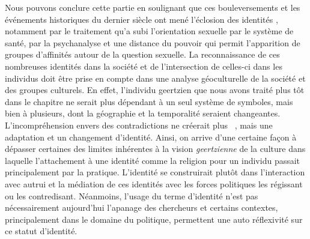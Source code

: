 Nous pouvons conclure cette partie en soulignant que ces bouleversements et les événements historiques du dernier siècle ont mené l'éclosion des identités \lgbt{}, notamment par le traitement qu'a subi l'orientation sexuelle par le système de santé, par la psychanalyse et une distance du pouvoir qui permit l'apparition de groupes d'affinités autour de la question sexuelle. 
La reconnaissance de ces nombreuses identités dans la société et de l'intersection de celles-ci dans les individus doit être prise en compte dans une analyse géoculturelle de la société et des groupes culturels.
En effet, l'individu geertzien que nous avons traité plus tôt dans le chapitre ne serait plus dépendant à un seul système de symboles, mais bien à plusieurs, dont la géographie et la temporalité seraient changeantes.
L'incompréhension envers des contradictions ne créerait plus ~\citep[33]{Geertz1972}, mais une adaptation et un changement d'identité.
Ainsi, on arrive d'une certaine façon à dépasser certaines des limites inhérentes à la vision \emph{geertzienne} de la culture dans laquelle l'attachement à une identité comme la religion pour un individu passait principalement par la pratique.
L'identité se construirait plutôt dans l'interaction avec autrui et la médiation de ces identités avec les forces politiques les régissant ou les contredisant.
Néanmoins, l'usage du terme d'identité n'est pas nécessairement aujourd'hui l'apanage des chercheurs et certains contextes, principalement dans le domaine du politique, permettent une auto réflexivité sur ce statut d'identité.

